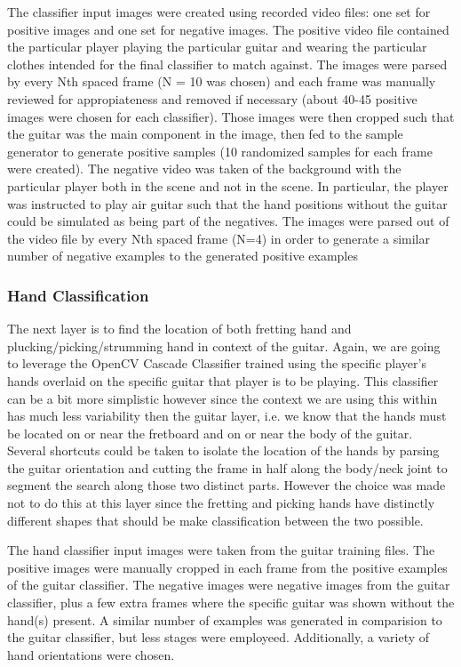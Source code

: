 \par
The classifier input images were created using recorded video files:
one set for positive images and one set for negative images.
The positive video file contained the particular player playing the particular guitar
and wearing the particular clothes intended for the final classifier to match against.
The images were parsed by every Nth spaced frame (N = 10 was chosen)
and each frame was manually reviewed for appropiateness and removed if necessary
(about 40-45 positive images were chosen for each classifier).
Those images were then cropped such that the guitar was the main component in the image,
then fed to the sample generator to generate positive samples
(10 randomized samples for each frame were created).
The negative video was taken of the background with the particular player both in the scene
and not in the scene.
In particular, the player was instructed to play air guitar such that the hand positions
without the guitar could be simulated as being part of the negatives.
The images were parsed out of the video file by every Nth spaced frame (N=4) in order to generate
a similar number of negative examples to the generated positive examples

\subsubsection{Hand Classification}
The next layer is to find the location of both fretting hand and plucking/picking/strumming hand in context of the guitar.
Again, we are going to leverage the OpenCV Cascade Classifier trained using the specific player's hands overlaid on the
specific guitar that player is to be playing.
This classifier can be a bit more simplistic however since the context we are using this 
within has much less variability then the guitar layer, 
i.e. we know that the hands must be located on or near the fretboard and on or near the body of the guitar.
Several shortcuts could be taken to isolate the location of the hands by parsing the guitar orientation
and cutting the frame in half along the body/neck joint to segment the search along those two distinct parts.
However the choice was made not to do this at this layer since the fretting and picking hands have distinctly
different shapes that should be make classification between the two possible.
\par
The hand classifier input images were taken from the guitar training files.
The positive images were manually cropped in each frame from the positive examples of the guitar classifier.
The negative images were negative images from the guitar classifier, plus a few extra frames where
the specific guitar was shown without the hand(s) present.
A similar number of examples was generated in comparision to the guitar classifier,
but less stages were employeed.
Additionally, a variety of hand orientations were chosen.

